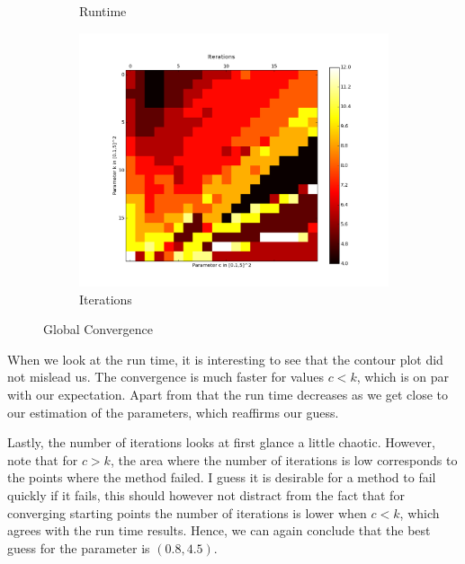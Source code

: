 \documentclass{article}
\begin{document}
\begin{figure}
\begin{subfigure}[b]{0.45\textwidth}
        \caption{Runtime}
        \label{fig:ru}
    \end{subfigure}
    \begin{subfigure}[b]{0.45\textwidth}
        \includegraphics[width=\textwidth]{global_iter}
        \caption{Iterations}
        \label{fig:it}
    \end{subfigure}
    \caption{Global Convergence}
    \label{global}
\end{figure}
When we look at the run time, it is interesting to see that the contour plot did not mislead us.
The convergence is much faster for values $c<k$, which is on par with our expectation.
Apart from that the run time decreases as we get close to our estimation of the parameters,
which reaffirms our guess. \par
Lastly, the number of iterations looks at first glance a little chaotic. However, note that
for $c>k$, the area where the number of iterations is low corresponds to the points where the method failed. I guess it is desirable for a method to fail quickly if it fails, this should however not
distract from the fact that for converging starting points the number of iterations is lower when
$c<k$, which agrees with the run time results. Hence, we can again conclude that the best guess for
the parameter is $(0.8,4.5)$. 
\end{document}
